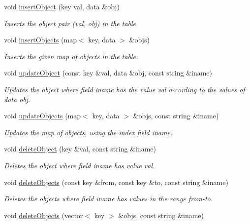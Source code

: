 \begin{CompactItemize}
void \hyperlink{classSQLTable_SQLTablea18}{insert\-Object} (key val, data \&obj)
\begin{CompactList}\small\item\em Inserts the object pair (val, obj) in the table.\item\end{CompactList}\item 
void \hyperlink{classSQLTable_SQLTablea19}{insert\-Objects} (map$<$ key, data $>$ \&objs)
\begin{CompactList}\small\item\em Inserts the given map of objects in the table.\item\end{CompactList}\item 
void \hyperlink{classSQLTable_SQLTablea20}{update\-Object} (const key \&val, data \&obj, const string \&iname)
\begin{CompactList}\small\item\em Updates the object where field iname has the value val according to the values of data obj.\item\end{CompactList}\item 
void \hyperlink{classSQLTable_SQLTablea21}{update\-Objects} (map$<$ key, data $>$ \&objs, const string \&iname)
\begin{CompactList}\small\item\em Updates the map of objects, using the index field iname.\item\end{CompactList}\item 
void \hyperlink{classSQLTable_SQLTablea22}{delete\-Object} (key \&val, const string \&iname)
\begin{CompactList}\small\item\em Deletes the object where field iname has value val.\item\end{CompactList}\item 
void \hyperlink{classSQLTable_SQLTablea23}{delete\-Objects} (const key \&from, const key \&to, const string \&iname)
\begin{CompactList}\small\item\em Deletes the objects where field iname has values in the range from-to.\item\end{CompactList}\item 
void \hyperlink{classSQLTable_SQLTablea24}{delete\-Objects} (vector$<$ key $>$ \&objs, const string \&iname)

\end{CompactItemize}
